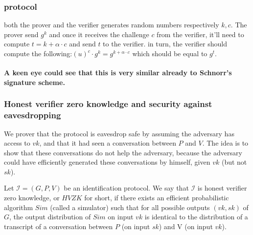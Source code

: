 \subsubsection{protocol}

both the prover and the verifier generates random numbers respectively
$k,c$. The prover send $g^{k}$ and once it receives the challenge
$c$ from the verifier, it'll need to compute $t=k+\alpha\cdot c$
and send $t$ to the verifier. in turn, the verifier should compute
the following:$\left(u\right)^{c}\cdot g^{k}=g^{k+\alpha\cdot c}$
which should be equal to $g^{t}$.

\paragraph{A keen eye could see that this is very similar already to Schnorr's
signature scheme.}

\subsubsection{Honest verifier zero knowledge and security against eavesdropping}

We prover that the protocol is eavesdrop safe by assuming the adversary
has access to $vk$, and that it had seen a conversation between $P$
and $V$. The idea is to show that these conversations do not help
the adversary, because the adversary could have efficiently generated
these conversations by himself, given $vk$ (but not $sk$).
\begin{definition}
Let $\mathcal{I}=(G,P,V)$ be an identification protocol. We say that
$\mathcal{I}$ is honest verifier zero knowledge, or $HVZK$ for short,
if there exists an efficient probabilistic algorithm $Sim$ (called
a simulator) such that for all possible outputs $(vk,sk)$ of $G$,
the output distribution of $Sim$ on input $vk$ is identical to the
distribution of a transcript of a conversation between $P$ (on input
$sk$) and V (on input $vk$).
\end{definition}


